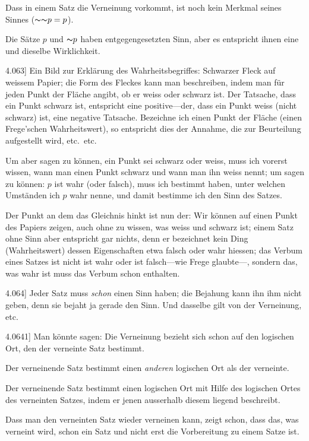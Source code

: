 \documentclass[12pt,oneside]{book}[2007/10/19]
\newcommand{\PropERef}[1]{\hyperref[PropE:#1]{#1}}
\newcommand{\PropositionG}[2]{%
  \item[\phantomsection\label{PropG:#1}\PropERef{#1}] #2%
}
\newcommand{\Not}[1]{\mathord{\thicksim} #1}
\newcommand{\Emph}[1]{\emph{#1}}%
\begin{document}
\begin{propositions}
{Dass in einem Satz die Verneinung vorkommt,
ist noch kein Merkmal seines Sinnes ($\Not{\Not{p}} = p$).

Die Sätze \glqq{}$p$\grqq{} und \glqq{}$\Not{p}$\grqq{} haben entgegengesetzten
Sinn, aber es entspricht ihnen eine und
dieselbe Wirklichkeit.}


\PropositionG{4.063}
{Ein Bild zur Erklärung des Wahrheitsbegriffes:
Schwarzer Fleck auf weissem Papier; die Form
des Fleckes kann man beschreiben, indem man
für jeden Punkt der Fläche angibt, ob er weiss
oder schwarz ist. Der Tatsache, dass ein Punkt
schwarz ist, entspricht eine positive---der, dass
ein Punkt weiss (nicht schwarz) ist, eine negative
Tatsache. Bezeichne ich einen Punkt der Fläche
(einen Frege'schen Wahrheitswert), so entspricht
dies der Annahme, die zur Beurteilung aufgestellt
wird, etc.\ etc.

Um aber sagen zu können, ein Punkt sei
schwarz oder weiss, muss ich vorerst wissen,
wann man einen Punkt schwarz und wann
man ihn weiss nennt; um sagen zu können:
\glqq{}$p$\grqq{} ist wahr (oder falsch), muss ich bestimmt
haben, unter welchen Umständen ich \glqq{}$p$\grqq{} wahr
nenne, und damit bestimme ich den Sinn des
Satzes.

Der Punkt an dem das Gleichnis hinkt ist
nun der: Wir können auf einen Punkt des Papiers
zeigen, auch ohne zu wissen, was weiss und
schwarz ist; einem Satz ohne Sinn aber entspricht
gar nichts, denn er bezeichnet kein Ding (Wahrheitswert)
dessen Eigenschaften etwa \glqq{}falsch\grqq{} oder
\glqq{}wahr\grqq{} hiessen; das Verbum eines Satzes ist nicht
\glqq{}ist wahr\grqq{} oder \glqq{}ist falsch\grqq{}---wie Frege glaubte---,
sondern das, was \glqq{}wahr ist\grqq{} muss das Verbum
schon enthalten.}


\PropositionG{4.064}
{Jeder Satz muss \Emph{schon} einen Sinn haben;
die Bejahung kann ihn ihm nicht geben, denn
sie bejaht ja gerade den Sinn. Und dasselbe gilt
von der Verneinung, etc.}


\PropositionG{4.0641}
{Man könnte sagen: Die Verneinung bezieht
sich schon auf den logischen Ort, den der verneinte
Satz bestimmt.

Der verneinende Satz bestimmt einen \Emph{anderen}
logischen Ort als der verneinte.

Der verneinende Satz bestimmt einen logischen
Ort mit Hilfe des logischen Ortes des verneinten
Satzes, indem er jenen ausserhalb diesem liegend
beschreibt.

Dass man den verneinten Satz wieder verneinen
kann, zeigt schon, dass das, was verneint wird,
schon ein Satz und nicht erst die Vorbereitung
zu einem Satze ist.}



\end{propositions}
\end{document}

